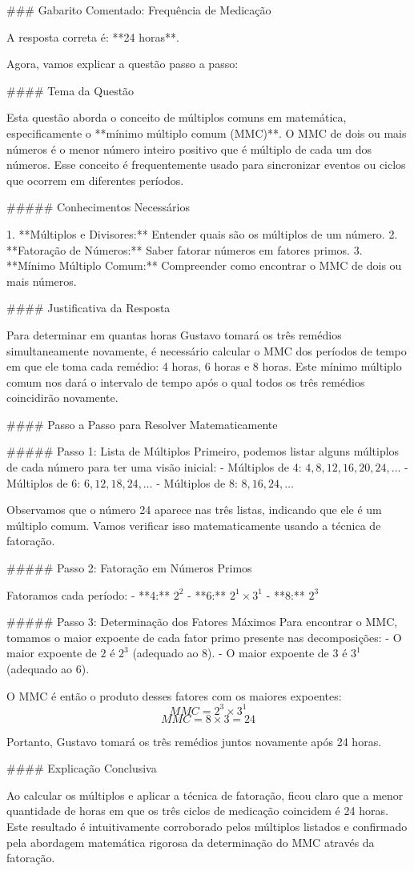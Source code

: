 ### Gabarito Comentado: Frequência de Medicação

A resposta correta é: **24 horas**.

Agora, vamos explicar a questão passo a passo:

#### Tema da Questão

Esta questão aborda o conceito de múltiplos comuns em matemática, especificamente o **mínimo múltiplo comum (MMC)**. O MMC de dois ou mais números é o menor número inteiro positivo que é múltiplo de cada um dos números. Esse conceito é frequentemente usado para sincronizar eventos ou ciclos que ocorrem em diferentes períodos.

##### Conhecimentos Necessários

1. **Múltiplos e Divisores:** Entender quais são os múltiplos de um número.
2. **Fatoração de Números:** Saber fatorar números em fatores primos.
3. **Mínimo Múltiplo Comum:** Compreender como encontrar o MMC de dois ou mais números.

#### Justificativa da Resposta

Para determinar em quantas horas Gustavo tomará os três remédios simultaneamente novamente, é necessário calcular o MMC dos períodos de tempo em que ele toma cada remédio: 4 horas, 6 horas e 8 horas. Este mínimo múltiplo comum nos dará o intervalo de tempo após o qual todos os três remédios coincidirão novamente.

#### Passo a Passo para Resolver Matematicamente

##### Passo 1: Lista de Múltiplos
Primeiro, podemos listar alguns múltiplos de cada número para ter uma visão inicial:
- Múltiplos de 4: \(4, 8, 12, 16, 20, 24, \dots\)
- Múltiplos de 6: \(6, 12, 18, 24, \dots\)
- Múltiplos de 8: \(8, 16, 24, \dots\)

Observamos que o número 24 aparece nas três listas, indicando que ele é um múltiplo comum. Vamos verificar isso matematicamente usando a técnica de fatoração.

##### Passo 2: Fatoração em Números Primos

Fatoramos cada período:
- **4:** \(2^2\)
- **6:** \(2^1 \times 3^1\)
- **8:** \(2^3\)

##### Passo 3: Determinação dos Fatores Máximos
Para encontrar o MMC, tomamos o maior expoente de cada fator primo presente nas decomposições:
- O maior expoente de \(2\) é \(2^3\) (adequado ao 8).
- O maior expoente de \(3\) é \(3^1\) (adequado ao 6).

O MMC é então o produto desses fatores com os maiores expoentes:
\[ MMC = 2^3 \times 3^1 \]
\[ MMC = 8 \times 3 = 24 \]

Portanto, Gustavo tomará os três remédios juntos novamente após 24 horas.

#### Explicação Conclusiva

Ao calcular os múltiplos e aplicar a técnica de fatoração, ficou claro que a menor quantidade de horas em que os três ciclos de medicação coincidem é 24 horas. Este resultado é intuitivamente corroborado pelos múltiplos listados e confirmado pela abordagem matemática rigorosa da determinação do MMC através da fatoração.
